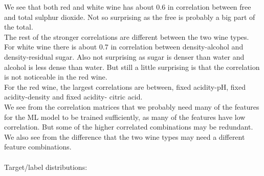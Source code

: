 \documentclass[12pt, letterpaper, twoside]{article}
\begin{document}
We see that both red and white wine has about 0.6 in correlation between free and total sulphur dioxide. Not so surprising as the free is probably a big part of the total.\\
The rest of the stronger correlations are different between the two wine types.\\
For white wine there is about 0.7 in correlation between density-alcohol and density-residual sugar.
Also not surprising as sugar is denser than water and alcohol is less dense than water. But still a little surprising is that the correlation is not noticeable in the red wine.\\
For the red wine, the largest correlations are between, fixed acidity-pH, fixed acidity-density and fixed acidity- citric acid.\\
We see from the correlation matrices that we probably need many of the features for the ML model to be trained sufficiently, as many of the features have low correlation. But some of the higher correlated combinations may be redundant. We also see from the difference that the two wine types may need a different feature combinations.\\
\newpage
\ \\
Target/label distributions:\\
\end{document}
